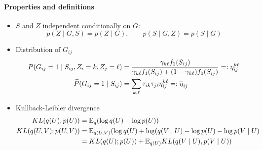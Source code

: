 \paragraph{Properties and definitions}
\begin{itemize}
 \item $S$ and $Z$ independent conditionally on $G$:
 $$
 p(Z \mid G, S) = p(Z \mid G), \qquad p(S \mid G, Z) = p(S \mid G)
 $$
 \item Distribution of $G_{ij}$
 \begin{align*}
 P(G_{ij} = 1 \mid S_{ij}, Z_i=k, Z_j=\ell) & = \frac{\gamma_{k\ell} f_1(S_{ij})}{\gamma_{k\ell} f_1(S_{ij}) + (1 - \gamma_{k\ell}) f_0(S_{ij})}  =: \eta^{k\ell}_{ij} \\
 \widetilde{P}(G_{ij} = 1 \mid S_{ij}) & = \sum_{k, \ell} \tau_{ik} \tau_{j\ell} \eta^{k\ell}_{ij} =: \overline{\eta}_{ij}
 \end{align*}
 \item Kullback-Leibler divergence
 \begin{align*}
  KL(q(U) ; p(U)) 
  & = \mathbb E_q (\log q(U) - \log p(U)) \\
  KL(q(U, V) ; p(U, V)) 
  & = \mathbb E_{q(U, V)} (\log q(U) + \log(q (V \mid U) - \log p(U) - \log p(V \mid U) \\
  & = KL(q(U) ; p(U)) + \mathbb E_{q(U)} KL(q(V \mid U), p(V \mid U))
 \end{align*}
\end{itemize}
